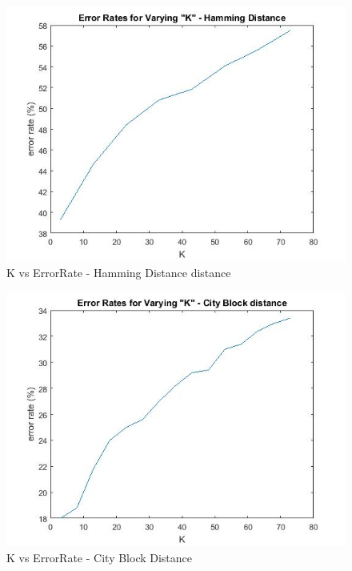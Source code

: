 \documentclass[10pt, letterpaper]{article}
\begin{document}
    \begin{figure}
    \includegraphics[width=\linewidth]{images/hamm_varyingK}
    \caption{ K vs ErrorRate - Hamming Distance distance}
    \label{fig:varyingK}
    \end{figure}
    
\begin{figure}
    \includegraphics[width=\linewidth]{images/cb_varyingK.jpg}
    \caption{ K vs ErrorRate - City Block Distance}
    \label{fig:cb_varyingK}
    \end{figure}
\end{document}
